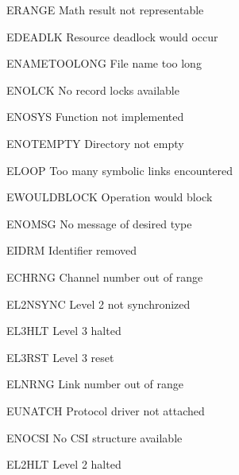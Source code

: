 \begin{datadesc}{ERANGE} Math result not representable \end{datadesc}
\begin{datadesc}{EDEADLK} Resource deadlock would occur \end{datadesc}
\begin{datadesc}{ENAMETOOLONG} File name too long \end{datadesc}
\begin{datadesc}{ENOLCK} No record locks available \end{datadesc}
\begin{datadesc}{ENOSYS} Function not implemented \end{datadesc}
\begin{datadesc}{ENOTEMPTY} Directory not empty \end{datadesc}
\begin{datadesc}{ELOOP} Too many symbolic links encountered \end{datadesc}
\begin{datadesc}{EWOULDBLOCK} Operation would block \end{datadesc}
\begin{datadesc}{ENOMSG} No message of desired type \end{datadesc}
\begin{datadesc}{EIDRM} Identifier removed \end{datadesc}
\begin{datadesc}{ECHRNG} Channel number out of range \end{datadesc}
\begin{datadesc}{EL2NSYNC} Level 2 not synchronized \end{datadesc}
\begin{datadesc}{EL3HLT} Level 3 halted \end{datadesc}
\begin{datadesc}{EL3RST} Level 3 reset \end{datadesc}
\begin{datadesc}{ELNRNG} Link number out of range \end{datadesc}
\begin{datadesc}{EUNATCH} Protocol driver not attached \end{datadesc}
\begin{datadesc}{ENOCSI} No CSI structure available \end{datadesc}
\begin{datadesc}{EL2HLT} Level 2 halted \end{datadesc}
